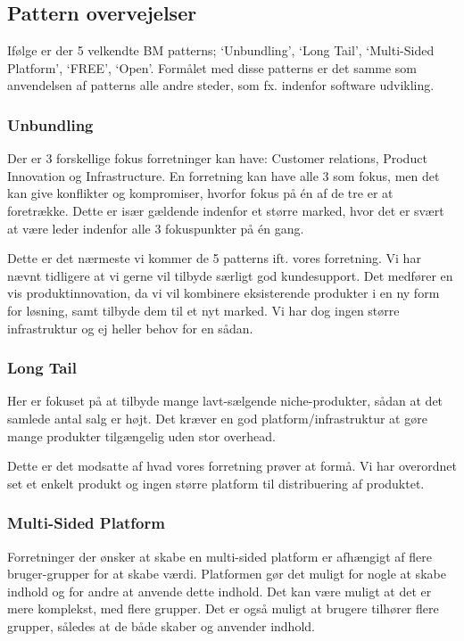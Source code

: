 \subsection{Pattern overvejelser}
Ifølge \citet[pp. 52-119]{osterwalder2009business} er der 5 velkendte BM patterns; `Unbundling', `Long Tail', `Multi-Sided Platform', `FREE', `Open'.
Formålet med disse patterns er det samme som anvendelsen af patterns alle andre steder, som fx. indenfor software udvikling.

\subsubsection{Unbundling}
Der er 3 forskellige fokus forretninger kan have: Customer relations, Product Innovation og Infrastructure.
En forretning kan have alle 3 som fokus, men det kan give konflikter og kompromiser, hvorfor fokus på \'en af de tre er at foretrække.
Dette er især gældende indenfor et større marked, hvor det er svært at være leder indenfor alle 3 fokuspunkter på \'en gang.

Dette er det nærmeste vi kommer de 5 patterns ift. vores forretning.
Vi har nævnt tidligere at vi gerne vil tilbyde særligt god kundesupport.
Det medfører en vis produktinnovation, da vi vil kombinere eksisterende produkter i en ny form for løsning, samt tilbyde dem til et nyt marked.
Vi har dog ingen større infrastruktur og ej heller behov for en sådan.

\subsubsection{Long Tail}
Her er fokuset på at tilbyde mange lavt-sælgende niche-produkter, sådan at det samlede antal salg er højt.
Det kræver en god platform/infrastruktur at gøre mange produkter tilgængelig uden stor overhead.

Dette er det modsatte af hvad vores forretning prøver at formå.
Vi har overordnet set et enkelt produkt og ingen større platform til distribuering af produktet.

\subsubsection{Multi-Sided Platform}
Forretninger der ønsker at skabe en multi-sided platform er afhængigt af flere bruger-grupper for at skabe værdi.
Platformen gør det muligt for nogle at skabe indhold og for andre at anvende dette indhold.
Det kan være muligt at det er mere komplekst, med flere grupper.
Det er også muligt at brugere tilhører flere grupper, således at de både skaber og anvender indhold.

